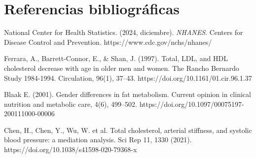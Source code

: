 \indent
\section{Referencias bibliográficas}
\leftskip 0.3in
\parindent -0.3in


National Center for Health Statistics. (2024, diciembre). \textit{NHANES}. Centers for Disease Control and Prevention. https://www.cdc.gov/nchs/nhanes/

Ferrara, A., Barrett-Connor, E., \& Shan, J. (1997). Total, LDL, and HDL cholesterol decrease with age in older men and women. The Rancho Bernardo Study 1984-1994. Circulation, 96(1), 37–43. https://doi.org/10.1161/01.cir.96.1.37

Blaak E. (2001). Gender differences in fat metabolism. Current opinion in clinical nutrition and metabolic care, 4(6), 499–502. https://doi.org/10.1097/00075197-200111000-00006

Chen, H., Chen, Y., Wu, W. et al. Total cholesterol, arterial stiffness, and systolic blood pressure: a mediation analysis. Sci Rep 11, 1330 (2021). https://doi.org/10.1038/s41598-020-79368-x